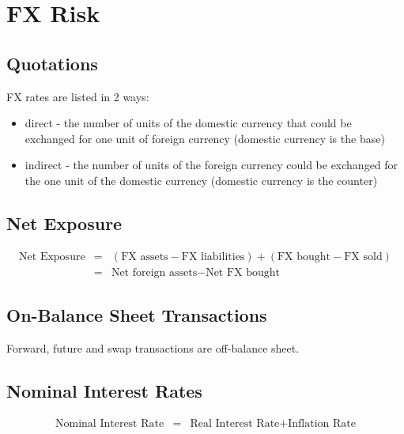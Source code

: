 \chapter{FX Risk}

\section{Quotations}
FX rates are listed in 2 ways:
\begin{itemize}
	\item direct - the number of units of the domestic currency that could be exchanged for one unit of foreign currency (domestic currency is the base)
	\item indirect - the number of units of the foreign currency could be exchanged for the one unit of the domestic currency (domestic currency is the counter)
\end{itemize}

\section{Net Exposure}
\begin{eqnarray}
	\text{Net Exposure} &=& (\text{FX assets} - \text{FX liabilities})+ (\text{FX bought} - \text{FX sold})\\
	&=& \text{Net foreign assets} - \text{Net FX bought}
\end{eqnarray}

\section{On-Balance Sheet Transactions}
Forward, future and swap transactions are off-balance sheet.

\section{Nominal Interest Rates}
\begin{eqnarray}
	\text{Nominal Interest Rate} &=& \text{Real Interest Rate} + \text{Inflation Rate}
\end{eqnarray}